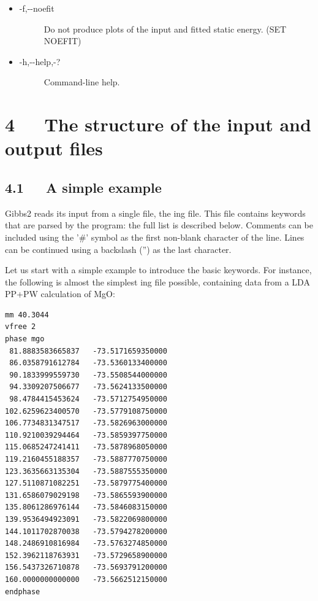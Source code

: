 \documentclass[a4paper]{article}
\begin{document}
\begin{itemize}
\begin{description}
\end{description}

\item %
\begin{description}
\item[{-f,-{}-noefit}] \leavevmode 
Do not produce plots of the input and fitted static energy.
(SET NOEFIT)

\end{description}

\item %
\begin{description}
\item[{-h,-{}-help,-?}] \leavevmode 
Command-line help.

\end{description}

\end{itemize}


\section{4~~~The structure of the input and output files%
  \label{the-structure-of-the-input-and-output-files}%
}


\subsection{4.1~~~A simple example%
  \label{a-simple-example}%
}

Gibbs2 reads its input from a single file, the ing file. This file
contains keywords that are parsed by the program: the full list is
described below. Comments can be included using the '\#' symbol as the
first non-blank character of the line. Lines can be continued using a
backslash ('') as the last character.

Let us start with a simple example to introduce the
basic keywords. For instance, the following is almost the simplest ing
file possible, containing data from a LDA PP+PW calculation of MgO:
%
\gibbslist
\begin{lstlisting}
mm 40.3044
vfree 2
phase mgo
 81.8883583665837   -73.5171659350000
 86.0358791612784   -73.5360133400000
 90.1833999559730   -73.5508544000000
 94.3309207506677   -73.5624133500000
 98.4784415453624   -73.5712754950000
102.6259623400570   -73.5779108750000
106.7734831347517   -73.5826963000000
110.9210039294464   -73.5859397750000
115.0685247241411   -73.5878968050000
119.2160455188357   -73.5887770750000
123.3635663135304   -73.5887555350000
127.5110871082251   -73.5879775400000
131.6586079029198   -73.5865593900000
135.8061286976144   -73.5846083150000
139.9536494923091   -73.5822069800000
144.1011702870038   -73.5794278200000
148.2486910816984   -73.5763274850000
152.3962118763931   -73.5729658900000
156.5437326710878   -73.5693791200000
160.0000000000000   -73.5662512150000
endphase
\end{lstlisting}
\end{document}

